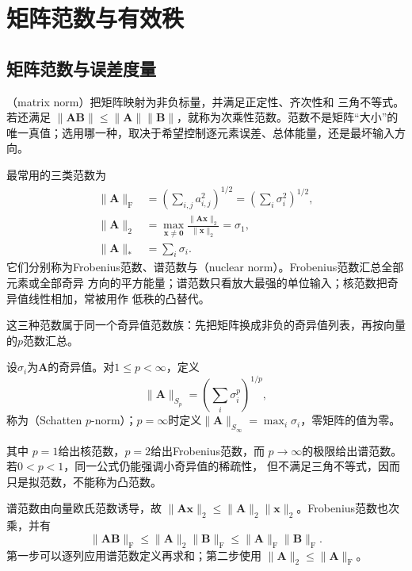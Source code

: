 \section{矩阵范数与有效秩}
\label{sec:matrix-analysis-norms-effective-rank}

\subsection{矩阵范数与误差度量}

（matrix norm）把矩阵映射为非负标量，并满足正定性、齐次性和
三角不等式。若还满足
$\lVert\bm{A}\bm{B}\rVert\leq
\lVert\bm{A}\rVert\lVert\bm{B}\rVert$，就称为次乘性范数。范数不是矩阵“大小”的
唯一真值；选用哪一种，取决于希望控制逐元素误差、总体能量，还是最坏输入方向。

最常用的三类范数为
\begin{align}
  \lVert\bm{A}\rVert_{\mathrm{F}}
  &=\left(\sum_{i,j}a_{i,j}^2\right)^{1/2}
  =
  \left(\sum_i\sigma_i^2\right)^{1/2},
  \label{eq:matrix-analysis-frobenius-norm}\\
  \lVert\bm{A}\rVert_2
  &=\max_{\bm{x}\neq\bm{0}}
  \frac{\lVert\bm{A}\bm{x}\rVert_2}{\lVert\bm{x}\rVert_2}
  =
  \sigma_1,
  \label{eq:matrix-analysis-spectral-norm}\\
  \lVert\bm{A}\rVert_*
  &=\sum_i\sigma_i.
  \label{eq:matrix-analysis-nuclear-norm}
\end{align}
它们分别称为Frobenius范数、谱范数与（nuclear norm）。Frobenius范数汇总全部元素或全部奇异
方向的平方能量；谱范数只看放大最强的单位输入；核范数把奇异值线性相加，常被用作
低秩的凸替代。

这三种范数属于同一个奇异值范数族：先把矩阵换成非负的奇异值列表，再按向量的$p$范数汇总。

\begin{definition}[Schatten范数]
\label{def:matrix-analysis-schatten-norm}
设$\sigma_i$为$\bm A$的奇异值。对$1\leq p<\infty$，定义
\[
  \lVert\bm{A}\rVert_{S_p}
  =\left(\sum_i\sigma_i^p\right)^{1/p},
\]
称为（Schatten \(p\)-norm）；$p=\infty$时定义$\lVert\bm A\rVert_{S_{\infty}}=\max_i\sigma_i$，零矩阵的值为零。
\end{definition}

其中
$p=1$给出核范数，$p=2$给出Frobenius范数，而
$p\to\infty$的极限给出谱范数。若$0<p<1$，同一公式仍能强调小奇异值的稀疏性，
但不满足三角不等式，因而只是拟范数，不能称为凸范数。

谱范数由向量欧氏范数诱导，故
$\lVert\bm{A}\bm{x}\rVert_2\leq
\lVert\bm{A}\rVert_2\lVert\bm{x}\rVert_2$。Frobenius范数也次乘，并有
\begin{equation}
  \lVert\bm{A}\bm{B}\rVert_{\mathrm{F}}
  \leq\lVert\bm{A}\rVert_2\lVert\bm{B}\rVert_{\mathrm{F}}
  \leq
  \lVert\bm{A}\rVert_{\mathrm{F}}\lVert\bm{B}\rVert_{\mathrm{F}}.
  \label{eq:matrix-analysis-mixed-submultiplicativity}
\end{equation}
第一步可以逐列应用谱范数定义再求和；第二步使用
$\lVert\bm{A}\rVert_2\leq\lVert\bm{A}\rVert_{\mathrm{F}}$。

